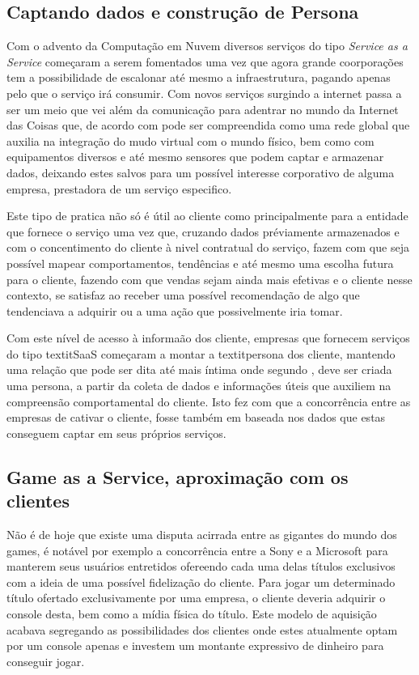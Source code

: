\begin{justify}
    \section{Captando dados e construção de Persona}

    Com o advento da Computação em Nuvem diversos serviços do tipo \textit{Service as a Service}
    começaram a serem fomentados uma vez que agora grande coorporações tem a possibilidade de
    escalonar até mesmo a infraestrutura, pagando apenas pelo que o serviço irá consumir. Com novos
    serviços surgindo a internet passa a ser um meio que vei além da comunicação para adentrar no
    mundo da Internet das Coisas que, de acordo com \cite{albertin2017internet} pode ser
    compreendida como uma rede global que auxilia na integração do mudo virtual com o mundo físico,
    bem como com equipamentos diversos e até mesmo sensores que podem captar e armazenar dados,
    deixando estes salvos para um possível interesse corporativo de alguma empresa, prestadora de um
    serviço especifico.

    Este tipo de pratica não só é útil ao cliente como principalmente para a entidade que fornece
    o serviço uma vez que, cruzando dados préviamente armazenados e com o concentimento do cliente à
    nivel contratual do serviço, fazem com que seja possível mapear comportamentos, tendências e até
    mesmo uma escolha futura para o cliente, fazendo com que vendas sejam ainda mais efetivas e o
    cliente nesse contexto, se satisfaz ao receber uma possível recomendação de algo que tendenciava
    a adquirir ou a uma ação que possivelmente iria tomar.

    Com este nível de acesso à informaão dos cliente, empresas que fornecem serviços do tipo
    textit{SaaS} começaram a montar a textit{persona} dos cliente, mantendo uma relação que pode ser
    dita até mais íntima onde segundo \cite{dospersona}, deve ser criada uma persona, a partir da
    coleta de dados e informações úteis que auxiliem na compreensão comportamental do cliente. Isto
    fez com que a concorrência entre as empresas de cativar o cliente, fosse também em baseada nos
    dados que estas conseguem captar em seus próprios serviços.

    \subsection{Game as a Service, aproximação com os clientes}

    Não é de hoje que existe uma disputa acirrada entre as gigantes do mundo dos games, é notável
    por exemplo a concorrência entre a Sony e a Microsoft para manterem seus usuários entretidos
    ofereendo cada uma delas títulos exclusivos com a ideia de uma possível fidelização do
    cliente. Para jogar um determinado título ofertado exclusivamente por uma empresa, o cliente
    deveria adquirir o console desta, bem como a mídia física do título. Este modelo de aquisição
    acabava segregando as possibilidades dos clientes onde estes atualmente optam por um console
    apenas e investem um montante expressivo de dinheiro para conseguir jogar.
    

\end{justify}
